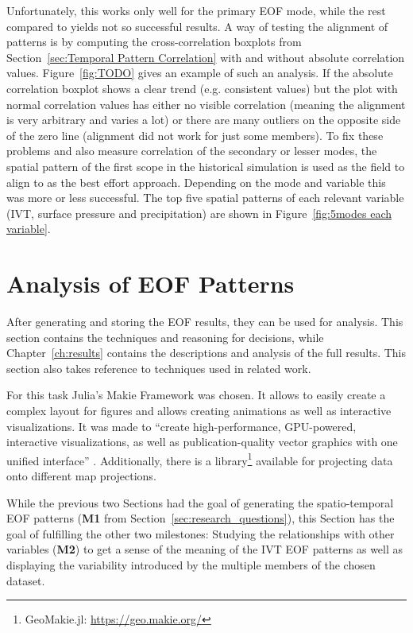 Unfortunately, this works only well for the primary EOF mode, while the rest compared to yields not so successful results. 
A way of testing the alignment of patterns is by computing the cross-correlation boxplots from Section~\ref{sec:Temporal Pattern Correlation} with and without absolute correlation values.
Figure~\ref{fig:TODO} gives an example of such an analysis. 
If the absolute correlation boxplot shows a clear trend (e.g. consistent values) but the plot with normal correlation values has either no visible correlation (meaning the alignment is very arbitrary and varies a lot) or there are many outliers on the opposite side of the zero line (alignment did not work for just some members). 
To fix these problems and also measure correlation of the secondary or lesser modes, the spatial pattern of the first scope in the historical simulation is used as the field to align to as the best effort approach. Depending on the mode and variable this was more or less successful. 
The top five spatial patterns of each relevant variable (IVT, surface pressure and precipitation) are shown in Figure~\ref{fig:5modes each variable}.



\section{Analysis of EOF Patterns}
\label{sec:vis_analysis}

After generating and storing the EOF results, they can be used for analysis. 
This section contains the techniques and reasoning for decisions, while Chapter~\ref{ch:results} contains the descriptions and analysis of the full results. 
This section also takes reference to techniques used in related work. 

For this task Julia's Makie Framework \cite{danisch_makiejl_2021} was chosen. 
It allows to easily create a complex layout for figures and allows creating animations as well as interactive visualizations. 
It was made to \enquote{create high-performance, GPU-powered, interactive visualizations, as well as publication-quality vector graphics with one unified interface} \cite{danisch_makiejl_2021}. 
Additionally, there is a library\footnote{GeoMakie.jl: \url{https://geo.makie.org/}} available for projecting data onto different map projections. 


While the previous two Sections had the goal of generating the spatio-temporal EOF patterns (\textbf{M1} from Section~\ref{sec:research_questions}), this Section has the goal of fulfilling the other two milestones:  
Studying the relationships with other variables (\textbf{M2}) to get a sense of the meaning of the IVT EOF patterns as well as displaying the variability introduced by the multiple members of the chosen dataset. 

